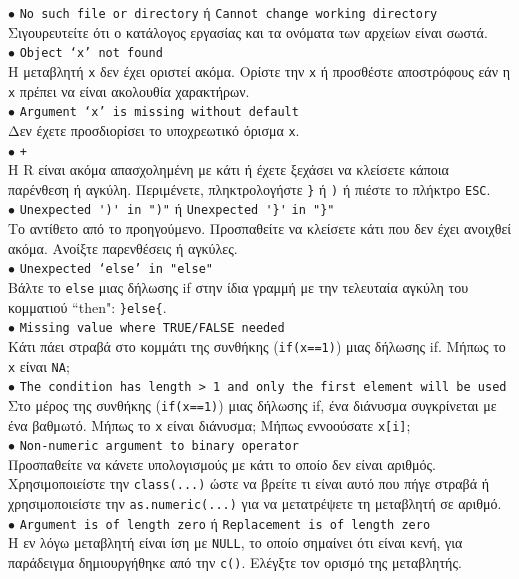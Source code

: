 \documentclass[a4paper,10pt,twocolumn]{article}
\begin{document}
\noindent $\bullet$ \texttt{No such file or directory} ή \texttt{Cannot change working directory} \\
Σιγουρευτείτε ότι ο κατάλογος εργασίας και τα ονόματα των αρχείων είναι σωστά.\\
\noindent $\bullet$ \texttt{Object `x' not found}\\
Η μεταβλητή \texttt{x} δεν έχει οριστεί ακόμα. Ορίστε την \texttt{x} ή προσθέστε αποστρόφους εάν η \texttt{x}
πρέπει να είναι ακολουθία χαρακτήρων.\\
\noindent $\bullet$ \texttt{Argument `x' is missing without default}\\
Δεν έχετε προσδιορίσει το υποχρεωτικό όρισμα \texttt{x}.\\
\noindent $\bullet$ \texttt{+}\\ %
Η R είναι ακόμα απασχολημένη με κάτι ή έχετε ξεχάσει να κλείσετε κάποια παρένθεση ή αγκύλη. Περιμένετε,
πληκτρολογήστε \verb!}! ή \verb!)! ή πιέστε το πλήκτρο \texttt{ESC}.\\ 
\noindent $\bullet$ \verb!Unexpected ')' in ")"! ή \verb!Unexpected '}'! \verb!in "}"!\\ 
Το αντίθετο από το προηγούμενο. Προσπαθείτε να κλείσετε κάτι που δεν έχει ανοιχθεί ακόμα. Ανοίξτε παρενθέσεις ή 
αγκύλες.\\
\noindent $\bullet$ \texttt{Unexpected `else' in "else"}\\
Βάλτε το \verb!else! μιας δήλωσης if στην ίδια γραμμή με την τελευταία αγκύλη του κομματιού ``then":
\verb!}else{!.\\
\noindent $\bullet$ \texttt{Missing value where TRUE/FALSE needed}\\
Κάτι πάει στραβά στο κομμάτι της συνθήκης (\texttt{if(x==1)}) μιας δήλωσης if. Μήπως το \texttt{x} είναι
\texttt{NA}; \\
\noindent $\bullet$ \texttt{The condition has length > 1 and only the first element will be used}\\
Στο μέρος της συνθήκης (\texttt{if(x==1)}) μιας δήλωσης if, ένα διάνυσμα συγκρίνεται με ένα βαθμωτό. Μήπως το
\texttt{x} είναι διάνυσμα; Μήπως εννοούσατε \texttt{x[i]};\\
\noindent $\bullet$ \texttt{Non-numeric argument to binary operator} \\
Προσπαθείτε να κάνετε υπολογισμούς με κάτι το οποίο δεν είναι αριθμός. Χρησιμοποιείστε την \texttt{class(...)}
ώστε να βρείτε τι είναι αυτό που πήγε στραβά ή χρησιμοποιείστε την \texttt{as.numeric(...)} για να μετατρέψετε
τη μεταβλητή σε αριθμό.\\
\noindent $\bullet$ \texttt{Argument is of length zero} ή \texttt{Replacement is of length zero}\\
Η εν λόγω μεταβλητή είναι ίση με \texttt{NULL}, το οποίο σημαίνει ότι είναι κενή, για παράδειγμα δημιουργήθηκε
από την \texttt{c()}. Ελέγξτε τον ορισμό της μεταβλητής.
\end{document}
